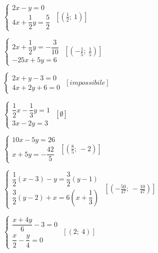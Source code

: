 \begin{esercizio}[\Ast]
\begin{multicols}{2}
\begin{enumeratea}
{$\left\{\begin{array}{l}
{2x-y=0}\\
{4x+\dfrac{1}{2}y=\dfrac{5}{2}}\end{array}\right.$
 \hfill $\left[\left(\frac{1}{2};~1\right)\right]$
\item $\left\{\begin{array}{l}
{2x+\dfrac{1}{2}y=-\dfrac{3}{10}}\\
{-25x+5y=6}\end{array}\right.$
 \hfill $\left[\left(-{\frac{1}{5}};~\frac{1}{5}\right)\right]$
\item $\left\{\begin{array}{l}
{2x+y-3=0}\\
{4x+2y+6=0}\end{array}\right.$
 \hfill $\left[impossibile\right]$
\item $\left\{\begin{array}{l}
{\dfrac{1}{2}x-\dfrac{1}{3}y=1}\\
{3x-2y=3}\end{array}\right.$
 \hfill $\left[\emptyset\right]$
\item $\left\{\begin{array}{l}
{10x-5y=26}\\
{x+5y=-\dfrac{42}{5}}\end{array}\right.$
 \hfill $\left[\left(\frac{8}{5};~-2\right)\right]$
\item $\left\{\begin{array}{l}
\dfrac{1}{2}(x-3)-y=\dfrac{3}{2}(y-1)\\
\dfrac{3}{2}(y-2)+x=6\left(x+\dfrac{1}{3}\right)\end{array}\right.$
 \hfill $\left[(-\frac{50}{47};~-\frac{10}{47})\right]$
\item $\left\{\begin{array}{l}
\dfrac{x+4y}{6}-3=0\\
\dfrac{x}{2}-\dfrac{y}{4}=0\end{array}\right.$
 \hfill $\left[(2;~4)\right]$}
\end{enumeratea}
\end{multicols}
\end{esercizio}

